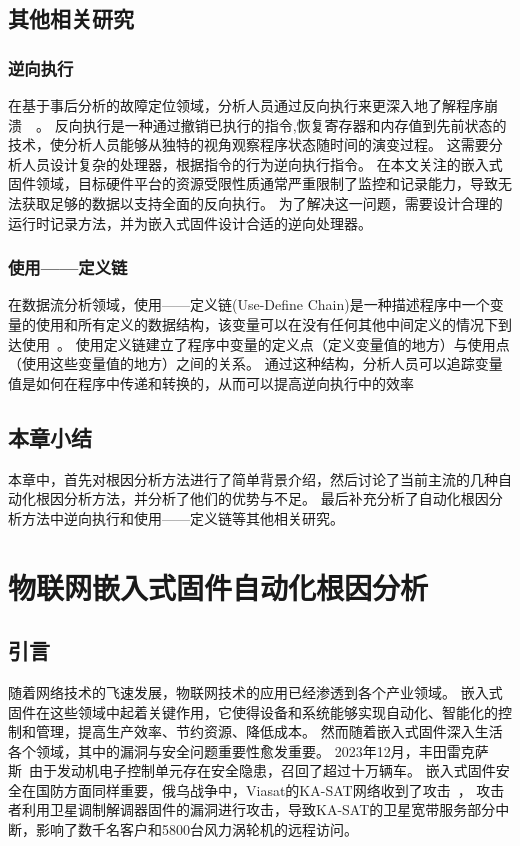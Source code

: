 \subsection{其他相关研究}
\subsubsection{逆向执行}
在基于事后分析的故障定位领域，分析人员通过反向执行来更深入地了解程序崩溃~\cite{RETracer2016}~\cite{REPT}。
反向执行是一种通过撤销已执行的指令,恢复寄存器和内存值到先前状态的技术，使分析人员能够从独特的视角观察程序状态随时间的演变过程。
这需要分析人员设计复杂的处理器，根据指令的行为逆向执行指令。
在本文关注的嵌入式固件领域，目标硬件平台的资源受限性质通常严重限制了监控和记录能力，导致无法获取足够的数据以支持全面的反向执行。
为了解决这一问题，需要设计合理的运行时记录方法，并为嵌入式固件设计合适的逆向处理器。

\subsubsection{使用——定义链}
在数据流分析领域，使用——定义链(Use-Define Chain)是一种描述程序中一个变量的使用和所有定义的数据结构，该变量可以在没有任何其他中间定义的情况下到达使用~\cite{Compilers2007}。
使用定义链建立了程序中变量的定义点（定义变量值的地方）与使用点（使用这些变量值的地方）之间的关系。
通过这种结构，分析人员可以追踪变量值是如何在程序中传递和转换的，从而可以提高逆向执行中的效率

\subsection{本章小结}
本章中，首先对根因分析方法进行了简单背景介绍，然后讨论了当前主流的几种自动化根因分析方法，并分析了他们的优势与不足。
最后补充分析了自动化根因分析方法中逆向执行和使用——定义链等其他相关研究。


\section{物联网嵌入式固件自动化根因分析}    %
\subsection{引言}                         %
随着网络技术的飞速发展，物联网技术的应用已经渗透到各个产业领域。
嵌入式固件在这些领域中起着关键作用，它使得设备和系统能够实现自动化、智能化的控制和管理，提高生产效率、节约资源、降低成本。
然而随着嵌入式固件深入生活各个领域，其中的漏洞与安全问题重要性愈发重要。
2023年12月，丰田雷克萨斯~\cite{toyota}由于发动机电子控制单元存在安全隐患，召回了超过十万辆车。
嵌入式固件安全在国防方面同样重要，俄乌战争中，Viasat的KA-SAT网络收到了攻击~\cite{KASAT}，
攻击者利用卫星调制解调器固件的漏洞进行攻击，导致KA-SAT的卫星宽带服务部分中断，影响了数千名客户和5800台风力涡轮机的远程访问。

